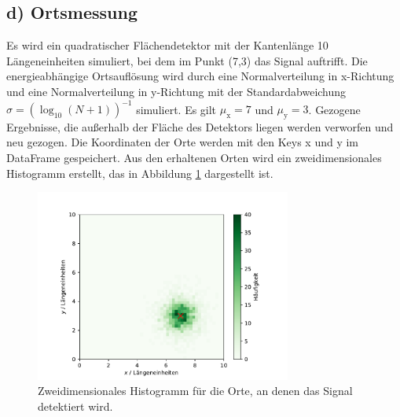 \documentclass[a4paper, 11pt]{article}
\begin{document}
\subsection*{d) Ortsmessung}
Es wird ein quadratischer Flächendetektor mit der Kantenlänge 10 Längeneinheiten
simuliert, bei dem im Punkt (7,3) das Signal auftrifft. Die energieabhängige
Ortsauflösung wird durch eine Normalverteilung in x-Richtung und eine Normalverteilung
in y-Richtung mit der Standardabweichung $\sigma = \left(\log_10(N+1)\right)^{-1}$
simuliert. Es gilt $\mu_\text{x}=7$ und $\mu_\text{y}=3$.
Gezogene Ergebnisse, die außerhalb der Fläche des Detektors liegen werden
verworfen und neu gezogen. Die Koordinaten der Orte werden mit den Keys x und y
im DataFrame gespeichert. Aus den erhaltenen Orten wird ein zweidimensionales
Histogramm erstellt, das in Abbildung \ref{fig:orte} dargestellt ist.
\begin{figure}
  \centering
  \includegraphics[width=0.75\textwidth]{../A11/Orte.pdf}
  \caption{Zweidimensionales Histogramm für die Orte, an denen das Signal detektiert
  wird.}
  \label{fig:orte}
\end{figure}

\FloatBarrier
\end{document}
